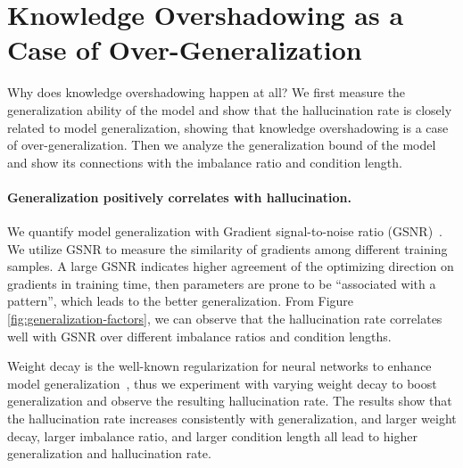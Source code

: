 \section{Knowledge Overshadowing as a Case of Over-Generalization }
\label{sec:theory}
Why does knowledge overshadowing happen at all? We first measure the generalization ability of the model and show that the hallucination rate is closely related to model generalization, showing that knowledge overshadowing is a case of over-generalization. Then we analyze the generalization bound of the model and show its connections with the imbalance ratio and condition length. 


\paragraph{Generalization positively correlates with hallucination.}
We quantify model generalization with Gradient
signal-to-noise ratio (GSNR)~\cite{liu2020understanding}. 
We utilize GSNR to measure the similarity of gradients among different training samples. A large GSNR indicates higher agreement of the optimizing direction on gradients in training time, then parameters are prone to be ``associated with a pattern'', which leads to the better generalization. From Figure \ref{fig:generalization-factors}, we can observe that the hallucination rate correlates well with GSNR over different imbalance ratios and condition lengths. 

Weight decay is the well-known regularization for neural networks to enhance model generalization~\cite{wei2019data}, thus we experiment with varying weight decay to boost generalization and observe the resulting hallucination rate. 
The results show that the hallucination rate increases consistently with generalization, and larger weight decay, larger imbalance ratio, and larger condition length all lead to higher generalization and hallucination rate.



